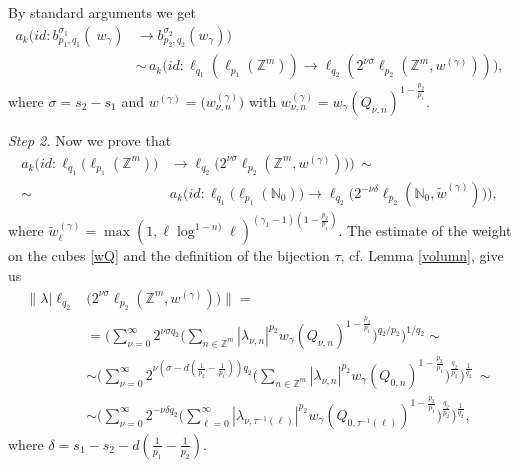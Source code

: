 \documentclass[12pt]{article}
\newcommand{\N}{{\mathbb N}}
\newcommand{\Z}{\mathbb Z}
\begin{document}
By standard arguments we get 
\begin{align} \nonumber%
	a_k\big(id: b^{\sigma_1}_{p_1,q_1}(\ w_\gamma) &\rightarrow  b^{\sigma_2}_{p_2,q_2}( w_\gamma) \big) \\
	& \sim \,   
	a_k\big( id: \ell_{q_1}(\ell_{p_1}(\Z^m))\rightarrow \ell_{q_2}(2^{\nu \sigma}\ell_{p_2}(\Z^m, w^{(\gamma)}))\big), \nonumber
\end{align}
where  $\sigma = s_2- s_1$ and  $w^{(\gamma)}= \big( w^{(\gamma)}_{\nu, n}\big)$ with  $w^{(\gamma)}_{\nu, n}= w_\gamma(Q_{\nu,n})^{1-\frac{p_2}{p_1}}$.  

{\em Step 2.} 
Now we prove that  
\begin{align}\label{17.3-0}
	a_k\Big( id: \ell_{q_1}\big(\ell_{p_1}(\Z^m)\big) & \rightarrow \ell_{q_2}\big(2^{\nu \sigma}\ell_{p_2}(\Z^m, w^{(\gamma)})\big)\Big)\, \sim  \\ 
	\sim\, & a_k\Big( id: \ell_{q_1}\big(\ell_{p_1}(\N_0)\big)\rightarrow \ell_{q_2}\big(2^{-\nu \delta} \ell_{p_2}(\N_0, \widetilde{w}^{(\gamma)})\big)\Big),
	\nonumber
\end{align}
where $\widetilde{w}^{(\gamma)}_\ell = \max(1,\ell\log^{1-n)}\ell)^{(\gamma_1-1)(1-\frac{p_2}{p_1})}$.
The estimate of the weight on the cubes \eqref{wQ} and the definition of the bijection $\tau$, cf. Lemma \ref{volumn}, give us 
\begin{align} \label{17.03-1}\nonumber
	\Big\|\lambda \Big|  \ell_{q_2}&\big(2^{\nu \sigma}\ell_{p_2}(\Z^m, w^{(\gamma)})\big) \Big\|  = \\
	& = \bigg(\sum_{\nu=0}^\infty 2^{\nu\sigma q_2}\bigg(\sum_{n\in\Z^m} |\lambda_{\nu,n}|^{p_2} w_\gamma(Q_{\nu,n})^{1-\frac{p_2}{p_1}}\bigg)^{q_2/p_2}\bigg)^{1/q_2}\sim  \nonumber\\ 
	& \sim \bigg(\sum_{\nu=0}^\infty 2^{\nu(\sigma - d(\frac{1}{p_2}- \frac{1}{p_1}))q_2}\bigg(\sum_{n\in\Z^m} |\lambda_{\nu,n}|^{p_2} w_\gamma(Q_{0,n})^{1-\frac{p_2}{p_1}}\bigg)^{\frac{q_2}{p_2}}\bigg)^{\frac{1}{q_2}}\,\sim \nonumber\\
	& \sim \bigg(\sum_{\nu=0}^\infty 2^{-\nu \delta q_2}\bigg(\sum_{\ell=0}^\infty |\lambda_{\nu,\tau^{-1}(\ell)}|^{p_2} w_\gamma(Q_{0,\tau^{-1}(\ell)})^{1-\frac{p_2}{p_1}}\bigg)^{\frac{q_2}{p_2}}\bigg)^{\frac{1}{q_2}}, \nonumber
\end{align}
where $\delta = s_1-s_2 - d(\frac{1}{p_1}- \frac{1}{p_2})$. 
\end{document}
